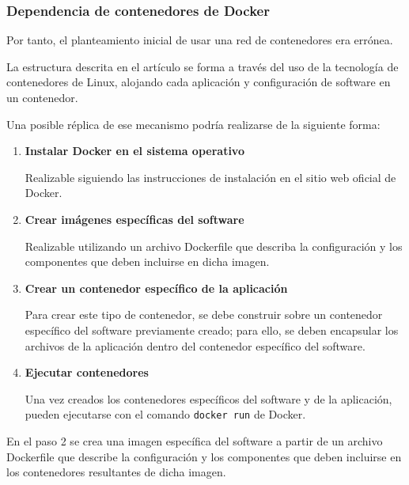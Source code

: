             \subsubsection{Dependencia de contenedores de Docker}

                Por tanto, el planteamiento inicial de usar una red de contenedores era errónea.
                
                La estructura descrita en el artículo se forma a través del uso de la tecnología de contenedores de Linux, alojando cada aplicación y configuración de software en un contenedor.

                Una posible réplica de ese mecanismo podría realizarse de la siguiente forma:

                \begin{enumerate}

                    \item \textbf{Instalar Docker en el sistema operativo}
                    
                    Realizable siguiendo las instrucciones de instalación en el sitio web oficial de Docker.
                
                    \item \textbf{Crear imágenes específicas del software}
                    
                    Realizable utilizando un archivo Dockerfile que describa la configuración y los componentes que deben incluirse en dicha imagen.

                    \item \textbf{Crear un contenedor específico de la aplicación}

                    Para crear este tipo de contenedor, se debe construir sobre un contenedor específico del software previamente creado; para ello, se deben encapsular los archivos de la aplicación dentro del contenedor específico del software.

                    \item \textbf{Ejecutar contenedores}
                    
                    Una vez creados los contenedores específicos del software y de la aplicación, pueden ejecutarse con el comando \texttt{docker run} de Docker.

                \end{enumerate}

                En el paso 2 se crea una imagen específica del software a partir de un archivo Dockerfile que describe la configuración y los componentes que deben incluirse en los contenedores resultantes de dicha imagen.

